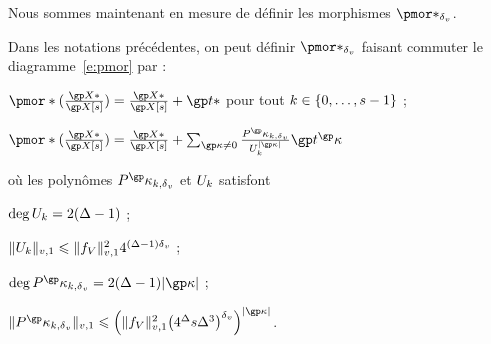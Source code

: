 Nous sommes maintenant en mesure de définir les morphismes \( \pmor*_\dv \).

\begin{lem} \label{l:def-pmor}
  Dans les notations précédentes, on peut définir \( \pmor*_\dv \) faisant
  commuter le diagramme~\ref{e:pmor} par :
  \begin{enumthm}
    \item \( \pmor*(\frac{ \vp* }{ \vp[\anydim] })
        = \frac{ \vp* }{ \vp[\anydim] } + \psp* \)
      pour tout \( \ind \in \set{0, \dots, \anydim-1} \) ;
    \item \( \pmor*(\frac{ \vp* }{ \vp[\anydim] })
        = \frac{ \vp* }{ \vp[\anydim] }
        + \sum_{\derp \neq 0}
        \frac{ P^\derp_{\ind, \dv} }{ U_\ind^{\lgr\derp} }
        \psp^\derp
      \)
  \end{enumthm}
  où les polynômes \( P^\derp_{\ind, \dv} \) et \(  U_\ind \) satisfont
  \begin{enumthm}
    \item \( \deg  U_\ind   =   2 (\anydeg - 1) \) ;
    \item \( \nv1{ U_\ind } \le \nv1{ \chow\anyvar }^2 4^{(\anydeg-1)\dv} \) ;
    \item \( \deg  P^\derp_{\ind, \dv}   =   2 (\anydeg - 1) \lgr\derp \) ;
    \item \( \nv1{ P^\derp_{\ind, \dv} } \le \left(
          \nv1{ \chow\anyvar }^2
          \bigl( 4^\anydeg \anydim \anydeg^{3} \bigr)^\dv
        \right)^{\lgr\derp} \).
  \end{enumthm}
\end{lem}

